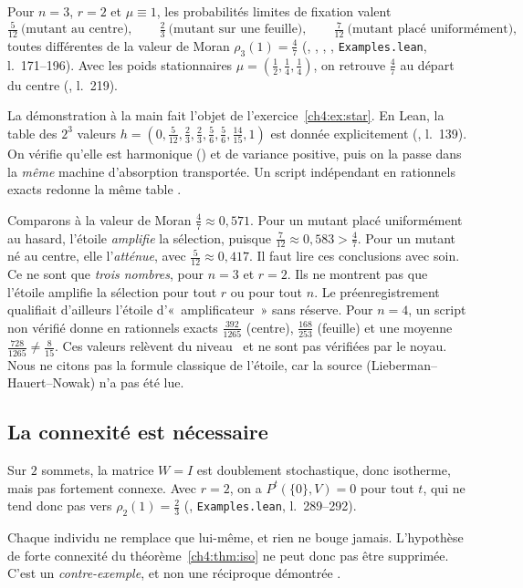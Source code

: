 \begin{proposition}\label{ch4:prop:star}
Pour $n=3$, $r=2$ et $\mu\equiv1$, les probabilités limites de fixation valent
\[
\tfrac5{12}\ \text{(mutant au centre)},\qquad \tfrac23\ \text{(mutant sur une feuille)},\qquad
\tfrac7{12}\ \text{(mutant placé uniformément)},
\]
toutes différentes de la valeur de Moran $\rho_3(1)=\frac47$ (,
, , , \texttt{Examples.lean},
l.~171--196). Avec les poids stationnaires $\mu=(\frac12,\frac14,\frac14)$, on retrouve $\frac47$ au départ du
centre (, l.~219).
\end{proposition}

La démonstration à la main fait l'objet de l'exercice~\ref{ch4:ex:star}. En Lean, la table des $2^3$ valeurs
$h=(0,\frac5{12},\frac23,\frac23,\frac56,\frac56,\frac{14}{15},1)$ est donnée explicitement (, l.~139).
On vérifie qu'elle est harmonique () et de variance positive, puis on la passe dans la
\emph{même} machine d'absorption transportée. Un script indépendant en rationnels exacts redonne la même table
\tierX.

\begin{physbox}
\tierC{} Comparons à la valeur de Moran $\frac47\approx0{,}571$. Pour un mutant placé uniformément au hasard, l'étoile
\emph{amplifie} la sélection, puisque $\frac7{12}\approx0{,}583>\frac47$. Pour un mutant né au centre, elle
l'\emph{atténue}, avec $\frac5{12}\approx0{,}417$. Il faut lire ces conclusions avec soin. Ce ne sont que
\emph{trois nombres}, pour $n=3$ et $r=2$. Ils ne montrent pas que l'étoile amplifie la sélection pour tout $r$ ou
pour tout $n$. Le préenregistrement qualifiait d'ailleurs l'étoile d'«~amplificateur~» sans réserve. Pour $n=4$,
un script non vérifié donne en rationnels exacts $\frac{392}{1265}$ (centre), $\frac{168}{253}$ (feuille) et une
moyenne $\frac{728}{1265}\ne\frac8{15}$. Ces valeurs relèvent du niveau~\tierX{} et ne sont pas vérifiées par le
noyau. Nous ne citons pas la formule classique de l'étoile, car la source (Lieberman--Hauert--Nowak) n'a pas été
lue.
\end{physbox}

\subsection{La connexité est nécessaire}
\begin{proposition}\label{ch4:prop:identite}
Sur $2$ sommets, la matrice $W=I$ est doublement stochastique, donc isotherme, mais pas fortement connexe. Avec
$r=2$, on a $P^t(\{0\},V)=0$ pour tout $t$, qui ne tend donc pas vers $\rho_2(1)=\frac23$
(, \texttt{Examples.lean}, l.~289--292).
\end{proposition}
Chaque individu ne remplace que lui-même, et rien ne bouge jamais. L'hypothèse de forte connexité du
théorème~\ref{ch4:thm:iso} ne peut donc pas être supprimée. C'est un \emph{contre-exemple}, et non une réciproque
démontrée \tierC.

